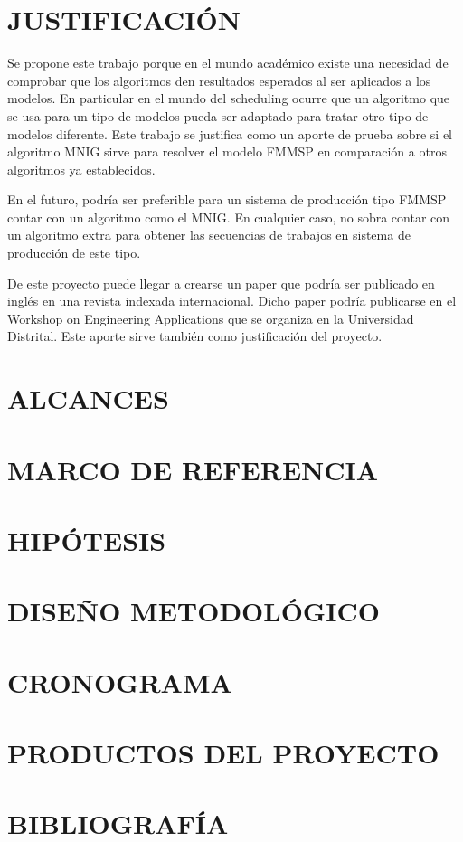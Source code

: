 \documentclass{article}
\begin{document}
\section{JUSTIFICACIÓN}

Se propone este trabajo porque en el mundo académico existe una necesidad de
comprobar que los algoritmos den resultados esperados al ser aplicados a los
modelos. En particular en el mundo
del scheduling ocurre que un algoritmo que se usa para un tipo de modelos pueda
ser adaptado para tratar otro tipo de modelos diferente. Este trabajo se
justifica como un aporte de prueba sobre si el algoritmo MNIG sirve para
resolver el modelo FMMSP en comparación a otros algoritmos ya establecidos.

\vspace{\baselineskip}
En el futuro, podría ser preferible para un sistema de producción tipo
\linebreak FMMSP
contar con un algoritmo como el MNIG. En cualquier caso, no sobra contar con
un algoritmo extra para obtener las secuencias de trabajos en sistema de
producción de este tipo.

\vspace{\baselineskip}
De este proyecto puede llegar a crearse un paper que podría ser publicado
en inglés en una revista indexada internacional. Dicho paper podría 
publicarse en el Workshop on Engineering Applications que se organiza en
la Universidad Distrital. Este aporte sirve también como justificación del 
proyecto.

\section{ALCANCES}



\section{MARCO DE REFERENCIA}



\section{HIPÓTESIS}



\section{DISEÑO METODOLÓGICO}



\section{CRONOGRAMA}



\section{PRODUCTOS DEL PROYECTO}



\section{BIBLIOGRAFÍA}

\printbibliography[heading=none]
\end{document}
